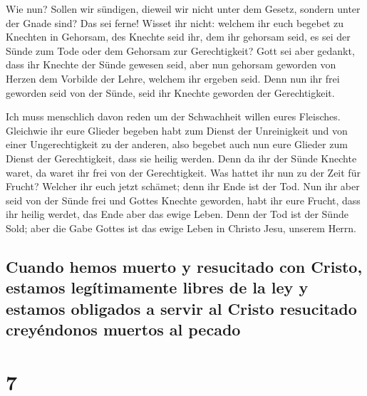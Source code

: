  Wie nun? Sollen wir sündigen, dieweil wir nicht unter
dem Gesetz, sondern unter der Gnade sind? Das sei ferne! 
Wisset ihr nicht: welchem ihr euch begebet zu Knechten in Gehorsam, des
Knechte seid ihr, dem ihr gehorsam seid, es sei der Sünde zum Tode oder
dem Gehorsam zur Gerechtigkeit?  Gott sei aber gedankt,
dass ihr Knechte der Sünde gewesen seid, aber nun gehorsam geworden von
Herzen dem Vorbilde der Lehre, welchem ihr ergeben seid. 
Denn nun ihr frei geworden seid von der Sünde, seid ihr Knechte geworden
der Gerechtigkeit.

 Ich muss menschlich davon reden um der Schwachheit
willen eures Fleisches. Gleichwie ihr eure Glieder begeben habt zum
Dienst der Unreinigkeit und von einer Ungerechtigkeit zu der anderen,
also begebet auch nun eure Glieder zum Dienst der Gerechtigkeit, dass
sie heilig werden.  Denn da ihr der Sünde Knechte waret,
da waret ihr frei von der Gerechtigkeit.  Was hattet ihr
nun zu der Zeit für Frucht? Welcher ihr euch jetzt schämet; denn ihr
Ende ist der Tod.  Nun ihr aber seid von der Sünde frei
und Gottes Knechte geworden, habt ihr eure Frucht, dass ihr heilig
werdet, das Ende aber das ewige Leben.  Denn der Tod ist
der Sünde Sold; aber die Gabe Gottes ist das ewige Leben in Christo
Jesu, unserem Herrn.

\hypertarget{cuando-hemos-muerto-y-resucitado-con-cristo-estamos-leguxedtimamente-libres-de-la-ley-y-estamos-obligados-a-servir-al-cristo-resucitado-creyuxe9ndonos-muertos-al-pecado}{%
\subsection{Cuando hemos muerto y resucitado con Cristo, estamos
legítimamente libres de la ley y estamos obligados a servir al Cristo
resucitado creyéndonos muertos al
pecado}\label{cuando-hemos-muerto-y-resucitado-con-cristo-estamos-leguxedtimamente-libres-de-la-ley-y-estamos-obligados-a-servir-al-cristo-resucitado-creyuxe9ndonos-muertos-al-pecado}}

\hypertarget{section-6}{%
\section{7}\label{section-6}}

